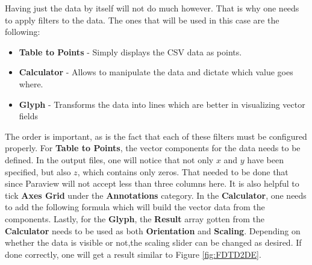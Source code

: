 Having just the data by itself will not do much however. That is why one needs to apply filters to the data. The ones that will be used in this case are the following:

\begin{itemize}
	\item \textbf{Table to Points} - Simply displays the CSV data as points.
	\item \textbf{Calculator} - Allows to manipulate the data and dictate which value goes where.
	\item \textbf{Glyph} - Transforms the data into lines which are better in visualizing vector fields
\end{itemize}

The order is important, as is the fact that each of these filters must be configured properly. For \textbf{Table to Points}, the vector components for the data needs to be defined. In the output files, one will notice that not only $x$ and $y$ have been specified, but also $z$, which contains only zeros. That needed to be done that since Paraview will not accept less than three columns here. It is also helpful to tick \textbf{Axes Grid} under the \textbf{Annotations} category. In the \textbf{Calculator}, one needs to add the following formula  which will build the vector data from the components. Lastly, for the \textbf{Glyph}, the \textbf{Result} array gotten from the \textbf{Calculator} needs to be used as both \textbf{Orientation} and \textbf{Scaling}. Depending on whether the data is visible or not,the scaling slider can be changed as desired. If done correctly, one will get a result similar to Figure \ref{fig:FDTD2DE}.

